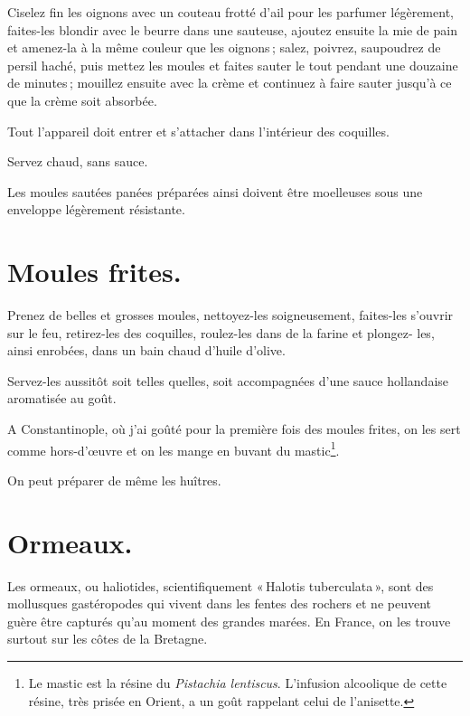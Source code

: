 Ciselez fin les oignons avec un couteau frotté d'ail pour les parfumer
légèrement, faites-les blondir avec le beurre dans une sauteuse, ajoutez
ensuite la mie de pain et amenez-la à la même couleur que les oignons ; salez,
poivrez, saupoudrez de persil haché, puis mettez les moules et faites sauter
le tout pendant une douzaine de minutes ; mouillez ensuite avec la crème et
continuez à faire sauter jusqu'à ce que la crème soit absorbée.

Tout l'appareil doit entrer et s'attacher dans l'intérieur des coquilles.

Servez chaud, sans sauce.

Les moules sautées panées préparées ainsi doivent être moelleuses sous une
enveloppe légèrement résistante.

\section*{\centering Moules frites.}

Prenez de belles et grosses moules, nettoyez-les soigneusement, faites-les
s'ouvrir sur le feu, retirez-les des coquilles, roulez-les dans de la farine et
plongez- les, ainsi enrobées, dans un bain chaud d'huile d'olive.

Servez-les aussitôt soit telles quelles, soit accompagnées d'une sauce
hollandaise aromatisée au goût.

A Constantinople, où j'ai goûté pour la première fois des moules frites, on les
sert comme hors-d'œuvre et on les mange en buvant du mastic\footnote{Le mastic
est la résine du \textit{Pistachia lentiscus}. L'infusion alcoolique de cette
résine, très prisée en Orient, a un goût rappelant celui de l'anisette.}.

\sk

On peut préparer de même les huîtres.

\section*{\centering Ormeaux.}

Les ormeaux, ou haliotides, scientifiquement « Halotis tuberculata », sont des
mollusques gastéropodes qui vivent dans les fentes des rochers et ne peuvent
guère être capturés qu'au moment des grandes marées. En France, on les trouve
surtout sur les côtes de la Bretagne.

